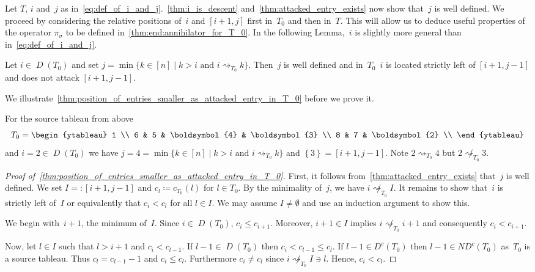 \documentclass[ALCO,ThmDefs,Unicode,epreuves]{cedram}
\newcommand{\bs}[1]{\boldsymbol{#1} }
\newcommand{\D}{\operatorname{\mathit{D}}}
\newcommand{\DC}{\operatorname{\mathit{D^c}}}
\newcommand{\ND}{\operatorname{\mathit{ND^c}}}
\newcommand{\set}[1]{\left\{ #1 \right\}}
\newcommand{\att}{\rightsquigarrow}
\begin{document}
Let $T$, $i$ and~$j$ as in~\eqref{eq:def_of_i_and_j}.~\cref{thm:i_is_descent} and~\cref{thm:attacked_entry_exists} now show that~$j$ is well defined. We proceed by considering the relative positions of~$i$ and $[i+1,j]$ first in~$T_0$ and then in~$T$. This will allow us to deduce useful properties of the operator $\pi_\sigma$ to be defined in~\cref{thm:end:annihilator_for_T_0}. In the following Lemma,~$i$ is slightly more general than in~\eqref{eq:def_of_i_and_j}.

\begin{lemma}
	\label{thm:position_of_entries_smaller_as_attacked_entry_in_T_0}
	Let $i\in \D(T_0)$ and set $j = \min \{k \in [n] \mid k>i \text{ and } i\att_{T_0} k \}$.
	Then~$j$ is well defined and in~$T_0$~$i$ is located strictly left of $[i+1,j-1]$ and does not attack $[i+1,j-1]$.
\end{lemma}

We illustrate~\cref{thm:position_of_entries_smaller_as_attacked_entry_in_T_0} before we prove it.

	\begin{exam} For the source tableau from above
		\[
			T_0
			= 
\begin{ytableau} 
1 \\ 
6 & 5 & \bs4 & \bs3 \\ 
8 & 7 & \bs2 \\ 
\end{ytableau} 
		\]
		and $i=2\in \D(T_0)$ we have $j = 4 =\min \{k \in [n] \mid k>i \text{ and } i\att_{T_0} k \}$ and $\set{3} = [i+1,j-1]$. Note $2\att_{T_0} 4$ but $2\not \att_{T_0} 3$.
	\end{exam}

	\begin{proof}[Proof of~\cref{thm:position_of_entries_smaller_as_attacked_entry_in_T_0}]
		First, it follows from~\cref{thm:attacked_entry_exists} that~$j$ is well defined. 
		We set $I =: [i+1,j-1]$ and $c_l \coloneqq c_{T_0}(l)$ for $l \in T_0$.
		By the minimality of~$j$, we have $i\not \att_{T_0} I$.
		It remains to show that~$i$ is strictly left of~$I$ or equivalently that $c_i < c_l$ for all $l\in I$.
		We may assume $I\neq \emptyset$ and use an induction argument to show this.
		
		We begin with~$i+1$, the minimum of~$I$.
		 Since $i\in \D(T_0)$, $c_i \leq c_{i+1}$. Moreover, $i+1\in I$ implies $i\not \att_{T_0} i+1$ and consequently $c_i < c_{i+1}$.
		
		Now, let $l\in I$ such that $l>i+1$ and $c_i < c_{l-1}$.
		If $l-1\in \D(T_0)$ then $c_i < c_{l-1} \leq c_l$.
		If $l-1\in \DC(T_0)$ then $l-1\in \ND(T_0)$ as~$T_0$ is a source tableau.
		Thus $c_l= c_{l-1}-1$ and $c_i \leq c_l$. Furthermore $c_i \neq c_l$ since $i\not \att_{T_0} I \ni l$.
		Hence, $c_i< c_l$.
			 \qedhere
	\end{proof}
\end{document}
